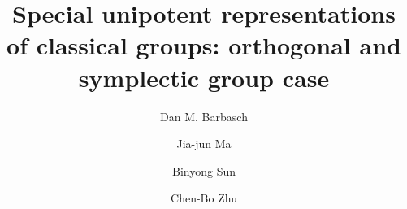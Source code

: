 \documentclass[12pt,a4paper]{amsart}
\numberwithin{equation}{section}
\theoremstyle{remark}
\begin{document}
\title[]{Special unipotent representations of classical groups: orthogonal and
  symplectic group case}

\author [D. Barbasch] {Dan M. Barbasch}
\address{the Department of Mathematics\\
  310 Malott Hall, Cornell University, Ithaca, New York 14853 }

\author [J.-J. Ma] {Jia-jun Ma}
\address{School of Mathematical Sciences\\
  Shanghai Jiao Tong University\\
  800 Dongchuan Road, Shanghai, 200240, China} 

\author [B. Sun] {Binyong Sun}
\address{Academy of Mathematics and Systems Science\\
  Chinese Academy of Sciences\\
  Beijing, 100190, China} 

\author [C.-B. Zhu] {Chen-Bo Zhu}
\address{Department of Mathematics\\
  National University of Singapore\\
  10 Lower Kent Ridge Road, Singapore 119076} 




 

\maketitle


\tableofcontents
\end{document}
